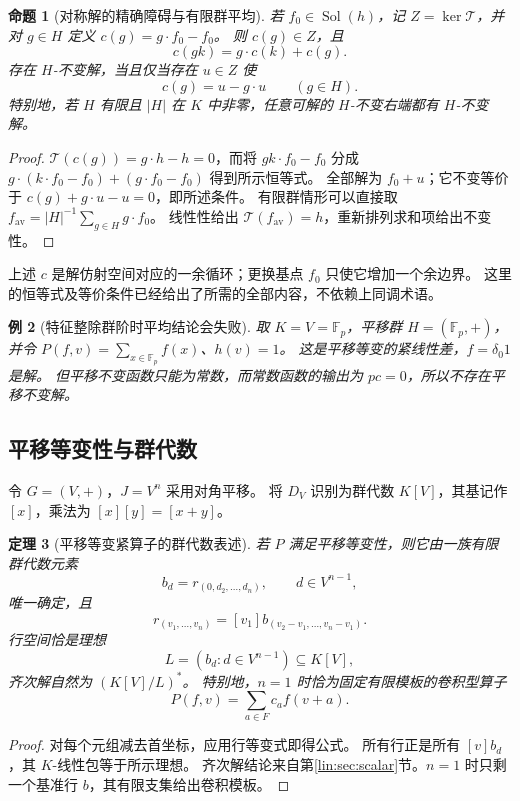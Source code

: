 \documentclass[11pt,a4paper,oneside,openany]{book}
\theoremstyle{lecture}
\newtheorem{theorem}{定理}[section]
\newtheorem{proposition}[theorem]{命题}
\newtheorem{example}[theorem]{例}
\newcommand{\T}{\mathcal T}
\newcommand{\Sol}{\operatorname{Sol}}
\numberwithin{equation}{section}
\begin{document}
\begin{proposition}[对称解的精确障碍与有限群平均]\label{lin:prop:symmetric}
若 $f_0\in\Sol(h)$，记 $Z=\ker\T$，并对 $g\in H$ 定义
$c(g)=g\cdot f_0-f_0$。
则 $c(g)\in Z$，且
\[
 c(gk)=g\cdot c(k)+c(g).
\]
存在 $H$-不变解，当且仅当存在 $u\in Z$ 使
\[
 c(g)=u-g\cdot u\qquad(g\in H).
\]
特别地，若 $H$ 有限且 $|H|$ 在 $K$ 中非零，任意可解的 $H$-不变右端都有 $H$-不变解。
\end{proposition}
\begin{proof}
$\T(c(g))=g\cdot h-h=0$，而将 $gk\cdot f_0-f_0$ 分成
$g\cdot(k\cdot f_0-f_0)+(g\cdot f_0-f_0)$ 得到所示恒等式。
全部解为 $f_0+u$；它不变等价于 $c(g)+g\cdot u-u=0$，即所述条件。
有限群情形可以直接取
$f_{\mathrm{av}}=|H|^{-1}\sum_{g\in H}g\cdot f_0$。
线性性给出 $\T(f_{\mathrm{av}})=h$，重新排列求和项给出不变性。
\end{proof}
上述 $c$ 是解仿射空间对应的一余循环；更换基点 $f_0$ 只使它增加一个余边界。
这里的恒等式及等价条件已经给出了所需的全部内容，不依赖上同调术语。

\begin{example}[特征整除群阶时平均结论会失败]
取 $K=V=\mathbb F_p$，平移群 $H=(\mathbb F_p,+)$，并令
$P(f,v)=\sum_{x\in\mathbb F_p}f(x)$、$h(v)=1$。
这是平移等变的紧线性差，$f=\delta_0 1$ 是解。
但平移不变函数只能为常数，而常数函数的输出为 $p c=0$，所以不存在平移不变解。
\end{example}

\subsection{平移等变性与群代数}
令 $G=(V,+)$，$J=V^n$ 采用对角平移。
将 $D_V$ 识别为群代数 $K[V]$，其基记作 $[x]$，乘法为 $[x][y]=[x+y]$。
\begin{theorem}[平移等变紧算子的群代数表述]\label{lin:thm:translation}
若 $P$ 满足平移等变性，则它由一族有限群代数元素
\[
 b_d=r_{(0,d_2,\ldots,d_n)},\qquad d\in V^{n-1},
\]
唯一确定，且
\[
 r_{(v_1,\ldots,v_n)}=[v_1]b_{(v_2-v_1,\ldots,v_n-v_1)}.
\]
行空间恰是理想
\[
 L=(b_d:d\in V^{n-1})\subseteq K[V],
\]
齐次解自然为 $(K[V]/L)^*$。
特别地，$n=1$ 时恰为固定有限模板的卷积型算子
\[
 P(f,v)=\sum_{a\in F}c_a f(v+a).
\]
\end{theorem}
\begin{proof}
对每个元组减去首坐标，应用行等变式即得公式。
所有行正是所有 $[v]b_d$，其 $K$-线性包等于所示理想。
齐次解结论来自第\ref{lin:sec:scalar}节。$n=1$ 时只剩一个基准行 $b$，其有限支集给出卷积模板。
\end{proof}
\end{document}
